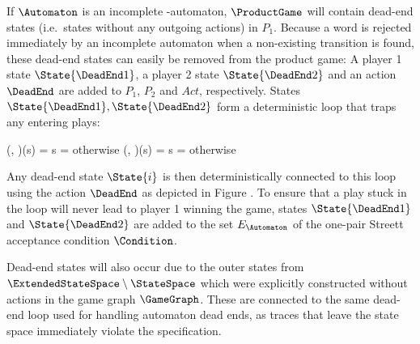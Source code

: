 \startsubsection[title={Dead-end States}]


    If $\Automaton$ is an incomplete \omega-automaton, $\ProductGame$ will contain dead-end states (i.e.\ states without any outgoing actions) in $P_1$.
    Because a word is rejected immediately by an incomplete automaton when a non-existing transition is found, these dead-end states can easily be removed from the product game:
    A player 1 state $\State{\DeadEnd1}$, a player 2 state $\State{\DeadEnd2}$ and an action $\DeadEnd$ are added to $P_1$, $P_2$ and $Act$, respectively.
    States $\State{\DeadEnd1}, \State{\DeadEnd2}$ form a deterministic loop that traps any entering plays:

    \startformula
        \startalign[n=2,align={right,left}]
            \NC \Transition(, \DeadEnd)(s) =
            \NC \startmathcases
                    \MC \StartIf s = 
                    \NR
                    \NC otherwise
                    \NR
                \stopmathcases
            \NR
            \NC \Transition(, \DeadEnd)(s) =
            \NC \startmathcases
                    \MC \StartIf s = 
                    \NR
                    \NC otherwise
                    \NR
                \stopmathcases
            \NR
        \stopalign
    \stopformula

    Any dead-end state $\State{i}$ is then deterministically connected to this loop using the action $\DeadEnd$ as depicted in Figure .
    To ensure that a play stuck in the loop will never lead to player 1 winning the game, states $\State{\DeadEnd1}$ and $\State{\DeadEnd2}$ are added to the set $E_\Automaton$ of the one-pair Streett acceptance condition $\Condition$.

    Dead-end states will also occur due to the outer states from $\ExtendedStateSpace \setminus \StateSpace$ which were explicitly constructed without actions in the game graph $\GameGraph$.
    These are connected to the same dead-end loop used for handling automaton dead ends, as traces that leave the state space immediately violate the specification.

